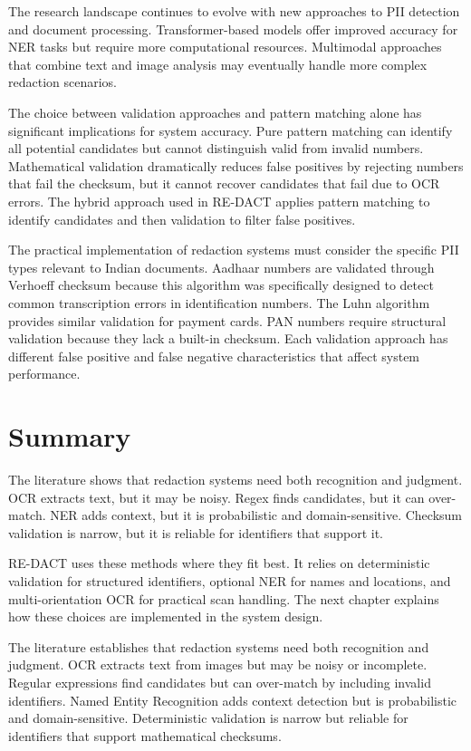 The research landscape continues to evolve with new approaches to PII detection and document processing. Transformer-based models offer improved accuracy for NER tasks but require more computational resources. Multimodal approaches that combine text and image analysis may eventually handle more complex redaction scenarios.

The choice between validation approaches and pattern matching alone has significant implications for system accuracy. Pure pattern matching can identify all potential candidates but cannot distinguish valid from invalid numbers. Mathematical validation dramatically reduces false positives by rejecting numbers that fail the checksum, but it cannot recover candidates that fail due to OCR errors. The hybrid approach used in RE-DACT applies pattern matching to identify candidates and then validation to filter false positives.

The practical implementation of redaction systems must consider the specific PII types relevant to Indian documents. Aadhaar numbers are validated through Verhoeff checksum because this algorithm was specifically designed to detect common transcription errors in identification numbers. The Luhn algorithm provides similar validation for payment cards. PAN numbers require structural validation because they lack a built-in checksum. Each validation approach has different false positive and false negative characteristics that affect system performance.

\bigskip

\section{Summary}

The literature shows that redaction systems need both recognition and judgment. OCR extracts text, but it may be noisy. Regex finds candidates, but it can over-match. NER adds context, but it is probabilistic and domain-sensitive. Checksum validation is narrow, but it is reliable for identifiers that support it.

RE-DACT uses these methods where they fit best. It relies on deterministic validation for structured identifiers, optional NER for names and locations, and multi-orientation OCR for practical scan handling. The next chapter explains how these choices are implemented in the system design.

\bigskip

The literature establishes that redaction systems need both recognition and judgment. OCR extracts text from images but may be noisy or incomplete. Regular expressions find candidates but can over-match by including invalid identifiers. Named Entity Recognition adds context detection but is probabilistic and domain-sensitive. Deterministic validation is narrow but reliable for identifiers that support mathematical checksums.

